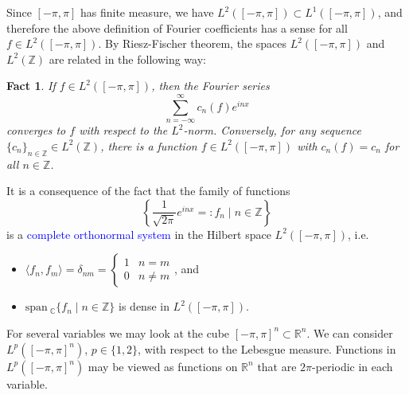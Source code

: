 \documentclass[12pt, oneside, a4paper]{article}
\newtheorem{fact}[thm]{Fact}
\theoremstyle{dfn}
\newcommand{\scalprod}[2]{\langle #1,#2 \rangle}
\providecommand{\Lper}[1]{L^{#1}([-\pi,\pi])}
\providecommand{\Lpern}[1]{L^{#1}([-\pi,\pi]^n)}
\def\Rbb{\ensuremath{\mathbb{R}}}
\def\Zbb{\ensuremath{\mathbb{Z}}}
\newcommand{\Com}{\mathbb{C}}
\providecommand{\abs}[1]{\lvert#1\rvert}
\newcommand{\spans}{\text{span}\ }
\begin{document}
Since $[-\pi,\pi]$ has finite measure, we have $\Lper{2} \subset \Lper{1}$, and therefore the above definition of Fourier coefficients has a sense for all $f \in \Lper{2}$.
By Riesz-Fischer theorem, the spaces $\Lper{2}$ and $L^2(\Zbb)$ are related in the following way:

\begin{fact}
If $f \in \Lper{2}$, then the Fourier series
\[
\sum_{n=-\infty}^\infty c_n(f) e^{inx}
\]
converges to $f$ with respect to the $L^2$-norm.
Conversely, for any sequence $\{c_n\}_{n \in \Zbb} \in L^2(\Zbb)$, there is a function $f \in \Lper{2}$ with $c_n(f) = c_n$ for all $n \in \Zbb$.
\end{fact}


It is a consequence of the fact that the family of functions
\[
\left\{ \frac{1}{\sqrt{2\pi}} e^{inx} =: f_n \;\bigg|\; n \in \Zbb \right\}
\]
is a \textcolor{blue}{complete orthonormal system} in the Hilbert space $\Lper{2}$, i.e.
\begin{itemize}
	\item
		$\scalprod{f_n}{f_m} = \delta_{nm} =
		\begin{cases}
		1 & n=m \\
		0 & n \neq m
		\end{cases}$,
		and
	\item $\spans_\Com \{ f_n \mid n \in \Zbb \}$ is dense in $\Lper{2}$.
\end{itemize}

For several variables we may look at the cube $[-\pi,\pi]^n \subset \Rbb^n$. We can consider $\Lpern{p}$, $p \in \{1,2\}$, with respect to the Lebesgue measure. Functions in $\Lpern{p}$ may be viewed as functions on $\Rbb^n$ that are $2\pi$-periodic in each variable.
\end{document}
